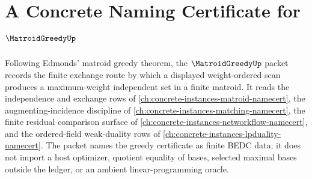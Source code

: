 \chapter{A Concrete Naming Certificate for $\MatroidGreedyUp$}
\label{ch:concrete-instances-matroid-greedy-namecert}

Following Edmonds' matroid greedy theorem, the $\MatroidGreedyUp$ packet records the finite exchange route by which a displayed weight-ordered scan produces a maximum-weight independent set in a finite matroid. It reads the independence and exchange rows of \autoref{ch:concrete-instances-matroid-namecert}, the augmenting-incidence discipline of \autoref{ch:concrete-instances-matching-namecert}, the finite residual comparison surface of \autoref{ch:concrete-instances-networkflow-namecert}, and the ordered-field weak-duality rows of \autoref{ch:concrete-instances-lpduality-namecert}. The packet names the greedy certificate as finite BEDC data; it does not import a host optimizer, quotient equality of bases, selected maximal bases outside the ledger, or an ambient linear-programming oracle.

